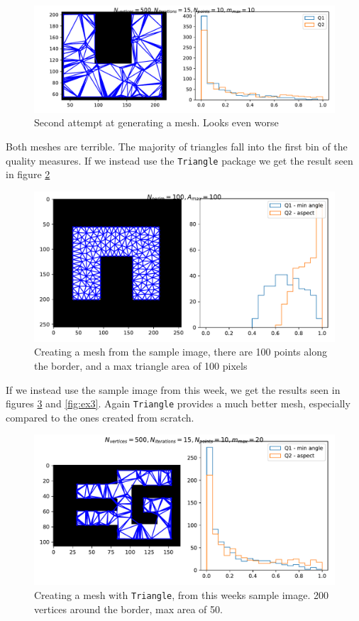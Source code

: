 \documentclass[sigconf]{acmart}
\begin{document}
\begin{figure}
	\includegraphics[width=\linewidth]{ex2.pdf}
	\caption{Second attempt at generating a mesh. Looks even worse}
	\label{fig:ex2}
\end{figure}
Both meshes are terrible. The majority of triangles fall into the first bin of the quality measures. If we instead use the \texttt{Triangle} package we get the result seen in figure \ref{fig:ex5}
\begin{figure}
	\includegraphics[width=\linewidth]{ex5.pdf}
	\caption{Creating a mesh from the sample image, there are 100 points along the border, and a max triangle area of 100 pixels}
	\label{fig:ex5}
\end{figure}
If we instead use the sample image from this week, we get the results seen in figures \ref{fig:ex4} and \ref{fig:ex3}. Again \texttt{Triangle} provides a much better mesh, especially compared to the ones created from scratch.
\begin{figure}
	\includegraphics[width=\linewidth]{ex4.pdf}
	\caption{Creating a mesh with \texttt{Triangle}, from this weeks sample image. 200 vertices around the border, max area of 50.}
	\label{fig:ex4}
\end{figure}
\end{document}

